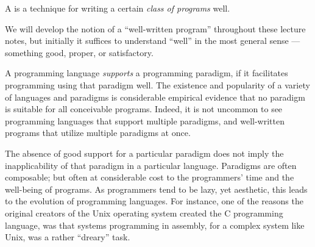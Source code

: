 
\begin{definition}

A  is a technique for writing a certain \emph{class
of programs} well.

\end{definition}

We will develop the notion of a ``well-written program''
throughout these lecture notes, but initially it suffices to understand
``well'' in the most general sense --- something good, proper, or satisfactory.

A programming language \emph{supports} a programming paradigm, if it
facilitates programming using that paradigm well. The existence and popularity
of a variety of languages and paradigms is considerable empirical evidence that
no paradigm is suitable for all conceivable programs. Indeed, it is not
uncommon to see programming languages that support multiple paradigms, and
well-written programs that utilize multiple paradigms at once.

The absence of good support for a particular paradigm does not imply the
inapplicability of that paradigm in a particular language.  Paradigms are often
composable; but often at considerable cost to the programmers' time and the
well-being of programs. As programmers tend to be lazy, yet aesthetic, this
leads to the evolution of programming languages. For instance, one of the
reasons the original creators of the Unix operating system created the C
programming language, was that systems programming in assembly, for a complex
system like Unix, was a rather ``dreary'' task\cite{the-development-of-c}.







